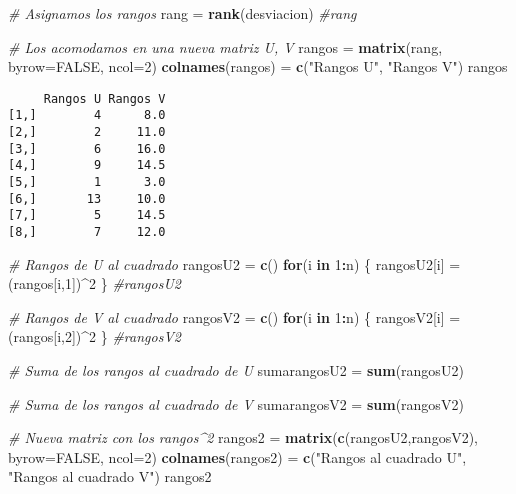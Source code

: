 \documentclass[a4paper,oneside,openany]{book}
\newenvironment{Shaded}{\begin{snugshade}}{\end{snugshade}}
\newcommand{\KeywordTok}[1]{\textcolor[rgb]{0.13,0.29,0.53}{\textbf{#1}}}
\newcommand{\DataTypeTok}[1]{\textcolor[rgb]{0.13,0.29,0.53}{#1}}
\newcommand{\DecValTok}[1]{\textcolor[rgb]{0.00,0.00,0.81}{#1}}
\newcommand{\StringTok}[1]{\textcolor[rgb]{0.31,0.60,0.02}{#1}}
\newcommand{\CommentTok}[1]{\textcolor[rgb]{0.56,0.35,0.01}{\textit{#1}}}
\newcommand{\OtherTok}[1]{\textcolor[rgb]{0.56,0.35,0.01}{#1}}
\newcommand{\ControlFlowTok}[1]{\textcolor[rgb]{0.13,0.29,0.53}{\textbf{#1}}}
\newcommand{\OperatorTok}[1]{\textcolor[rgb]{0.81,0.36,0.00}{\textbf{#1}}}
\newcommand{\NormalTok}[1]{#1}
\begin{document}
\begin{Shaded}
\begin{Highlighting}[]
\CommentTok{# Asignamos los rangos}
\NormalTok{rang =}\StringTok{ }\KeywordTok{rank}\NormalTok{(desviacion)}
\CommentTok{#rang}

\CommentTok{# Los acomodamos en una nueva matriz U, V}
\NormalTok{rangos =}\StringTok{ }\KeywordTok{matrix}\NormalTok{(rang, }\DataTypeTok{byrow=}\OtherTok{FALSE}\NormalTok{, }\DataTypeTok{ncol=}\DecValTok{2}\NormalTok{)}
\KeywordTok{colnames}\NormalTok{(rangos) =}\StringTok{ }\KeywordTok{c}\NormalTok{(}\StringTok{"Rangos U"}\NormalTok{, }\StringTok{"Rangos V"}\NormalTok{)}
\NormalTok{rangos}
\end{Highlighting}
\end{Shaded}

\begin{verbatim}
     Rangos U Rangos V
[1,]        4      8.0
[2,]        2     11.0
[3,]        6     16.0
[4,]        9     14.5
[5,]        1      3.0
[6,]       13     10.0
[7,]        5     14.5
[8,]        7     12.0
\end{verbatim}

\begin{Shaded}
\begin{Highlighting}[]
\CommentTok{# Rangos de U al cuadrado}
\NormalTok{rangosU2 =}\StringTok{ }\KeywordTok{c}\NormalTok{()}
\ControlFlowTok{for}\NormalTok{(i }\ControlFlowTok{in} \DecValTok{1}\OperatorTok{:}\NormalTok{n) \{}
\NormalTok{  rangosU2[i] =}\StringTok{ }\NormalTok{(rangos[i,}\DecValTok{1}\NormalTok{])}\OperatorTok{^}\DecValTok{2}
\NormalTok{\}}
\CommentTok{#rangosU2}

\CommentTok{# Rangos de V al cuadrado}
\NormalTok{rangosV2 =}\StringTok{ }\KeywordTok{c}\NormalTok{()}
\ControlFlowTok{for}\NormalTok{(i }\ControlFlowTok{in} \DecValTok{1}\OperatorTok{:}\NormalTok{n) \{}
\NormalTok{  rangosV2[i] =}\StringTok{ }\NormalTok{(rangos[i,}\DecValTok{2}\NormalTok{])}\OperatorTok{^}\DecValTok{2}
\NormalTok{\}}
\CommentTok{#rangosV2}

\CommentTok{# Suma de los rangos al cuadrado de U}
\NormalTok{sumarangosU2 =}\StringTok{ }\KeywordTok{sum}\NormalTok{(rangosU2)}

\CommentTok{# Suma de los rangos al cuadrado de V}
\NormalTok{sumarangosV2 =}\StringTok{ }\KeywordTok{sum}\NormalTok{(rangosV2)}

\CommentTok{# Nueva matriz con los rangos^2}
\NormalTok{rangos2 =}\StringTok{ }\KeywordTok{matrix}\NormalTok{(}\KeywordTok{c}\NormalTok{(rangosU2,rangosV2), }\DataTypeTok{byrow=}\OtherTok{FALSE}\NormalTok{, }\DataTypeTok{ncol=}\DecValTok{2}\NormalTok{)}
\KeywordTok{colnames}\NormalTok{(rangos2) =}\StringTok{ }\KeywordTok{c}\NormalTok{(}\StringTok{"Rangos al cuadrado U"}\NormalTok{, }\StringTok{"Rangos al cuadrado V"}\NormalTok{)}
\NormalTok{rangos2}
\end{Highlighting}
\end{Shaded}
\end{document}

